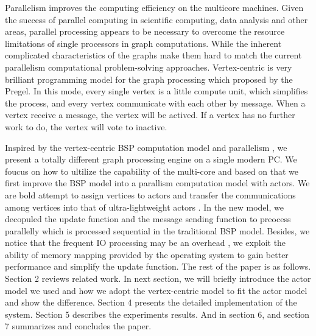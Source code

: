\documentclass[twocolumn,a4paper,10pt]{article}
\begin{document}
 \newline
Parallelism improves the computing efficiency on the multicore machines. Given the success of parallel computing in scientific computing, data analysis and other areas, parallel processing appears to be necessary to overcome the resource limitations of single processors in graph computations. While the inherent complicated characteristics of the graphs make them hard to match the current parallelism computational problem-solving approaches. Vertex-centric is very brilliant  programming model for the graph processing which proposed by the Pregel. In this mode, every single vertex is a little compute unit, which simplifies the process, and every vertex communicate with each other by message. When a vertex receive a message, the vertex will be actived. If a vertex has no further work to do, the vertex will vote to inactive. 
\newline


 Inspired by the vertex-centric  BSP computation model and parallelism , we present a totally different graph processing engine on a single modern PC. We foucus on how to ultilize the capability of the multi-core and based on that we first improve the BSP model into a parallism computation model with actors. We are bold attempt to assign vertices to actors and transfer the communications among vertices into that of ultra-lightweight actors . In the new model, we decopuled the update function and the message sending function to preocess parallelly which is processed sequential in the traditional BSP model.
 Besides, we notice that the frequent IO processing may be an overhead , we exploit the ability of memory mapping provided by the operating system to gain better performance and simplify the update function.\newline
The rest of the paper is as follows. Section 2 reviews related work. In next section, we will briefly introduce the actor model we used and how we  adopt the vertex-centric model to fit the actor model and show the difference. Section 4 presents the detailed implementation of the system. Section 5 describes the experiments results. And in section 6, and section 7 summarizes and concludes the paper.
\end{document}
